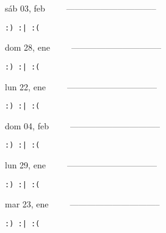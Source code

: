 \documentclass[letterpaper,10pt]{article}
\begin{document}
\begin{multicols}{3}
{sáb 03, feb\ \ \ \ \ --------------------------------}
\begin{flushright}\begin{small}\texttt{:) :| :(}\end{small}\end{flushright}
\vfill
{dom 28, ene\ \ \ \ \ --------------------------------}
\begin{flushright}\begin{small}\texttt{:) :| :(}\end{small}\end{flushright}\par
\vfill
{lun 22, ene\ \ \ \ \ --------------------------------}
\begin{flushright}\begin{small}\texttt{:) :| :(}\end{small}\end{flushright}\par
\vfill
\end{multicols}
\vspace{1.05cm}

\begin{multicols}{3}
{dom 04, feb\ \ \ \ \ --------------------------------}
\begin{flushright}\begin{small}\texttt{:) :| :(}\end{small}\end{flushright}
\vfill
{lun 29, ene\ \ \ \ \ --------------------------------}
\begin{flushright}\begin{small}\texttt{:) :| :(}\end{small}\end{flushright}\par
\vfill
{mar 23, ene\ \ \ \ \ --------------------------------}
\begin{flushright}\begin{small}\texttt{:) :| :(}\end{small}\end{flushright}\par
\vfill
\end{multicols}
\vspace{1.05cm}
\end{document}
